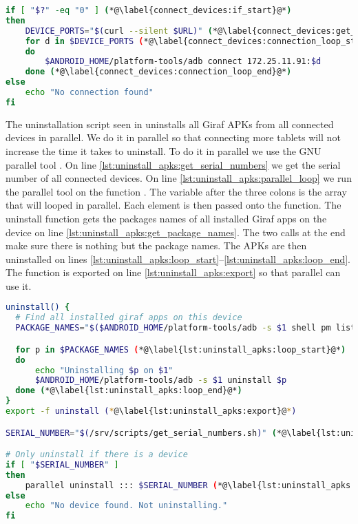 \begin{description}
\begin{lstlisting}[language=bash,caption=Script that connects to devices,label=lst:connect_devices]
if [ "$?" -eq "0" ] (*@\label{connect_devices:if_start}@*)
then
    DEVICE_PORTS="$(curl --silent $URL)" (*@\label{connect_devices:get_ports}@*)
    for d in $DEVICE_PORTS (*@\label{connect_devices:connection_loop_start}@*)
    do
        $ANDROID_HOME/platform-tools/adb connect 172.25.11.91:$d
    done (*@\label{connect_devices:connection_loop_end}@*)
else
    echo "No connection found"
fi
  \end{lstlisting}
  \item[Uninstallation Script] The uninstallation script seen in  uninstalls all Giraf APKs from all connected devices in parallel. We do it in parallel so that connecting more tablets will not increase the time it takes to uninstall. To do it in parallel we use the GNU parallel tool \parencite{Tange2011a}. On line \ref{lst:uninstall_apks:get_serial_numbers} we get the serial number of all connected devices. On line \ref{lst:uninstall_apks:parallel_loop} we run the parallel tool on the function . The variable  after the three colons is the array that will looped in parallel. Each element is then passed onto the  function. The uninstall function gets the packages names of all installed Giraf apps on the device on line \ref{lst:uninstall_apks:get_package_names}. The two  calls at the end make sure there is nothing but the package names. The APKs are then uninstalled on lines \ref{lst:uninstall_apks:loop_start}--\ref{lst:uninstall_apks:loop_end}. The function is exported on line \ref{lst:uninstall_apks:export} so that parallel can use it.
  \begin{lstlisting}[language=bash,caption=Script that uninstalls all installed Giraf apps on all devices,label=lst:uninstall_apks]
uninstall() {
  # Find all installed giraf apps on this device
  PACKAGE_NAMES="$($ANDROID_HOME/platform-tools/adb -s $1 shell pm list packages -f | grep dk.aau.cs.giraf | sed 's/.*apk=//' | sed 's/\s*//g')" (*@\label{lst:uninstall_apks:get_package_names}@*)

  for p in $PACKAGE_NAMES (*@\label{lst:uninstall_apks:loop_start}@*)
  do
      echo "Uninstalling $p on $1"
      $ANDROID_HOME/platform-tools/adb -s $1 uninstall $p
  done (*@\label{lst:uninstall_apks:loop_end}@*)
}
export -f uninstall (*@\label{lst:uninstall_apks:export}@*)

SERIAL_NUMBER="$(/srv/scripts/get_serial_numbers.sh)" (*@\label{lst:uninstall_apks:get_serial_numbers}@*)

# Only uninstall if there is a device
if [ "$SERIAL_NUMBER" ]
then
    parallel uninstall ::: $SERIAL_NUMBER (*@\label{lst:uninstall_apks:parallel_loop}@*)
else
    echo "No device found. Not uninstalling."
fi
  \end{lstlisting}


\end{description}
